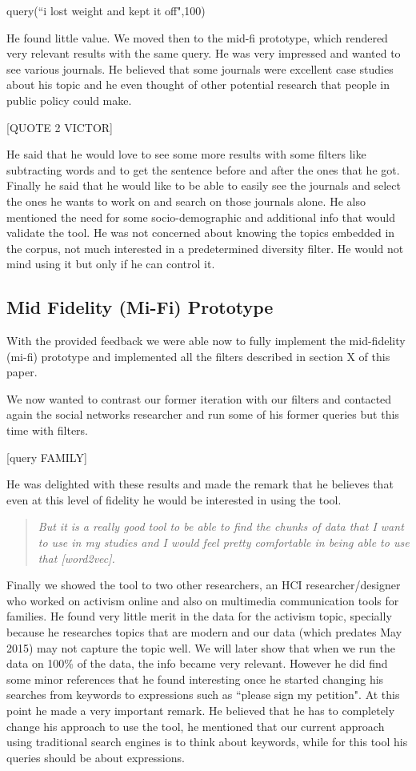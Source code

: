 \documentclass{sigchi}
\begin{document}
query(``i lost weight and kept it off",100)

He found little value. We moved then to the mid-fi prototype, which rendered very relevant results with the same query. He was very impressed and wanted to see various journals. He believed that some journals were excellent case studies about his topic and he even thought of other potential research that people in public policy could make. 

[QUOTE 2 VICTOR]

He said that he would love to see some more results with some filters like subtracting words and to get the sentence before and after the ones that he got. Finally he said that he would like to be able to easily see the journals and select the ones he wants to work on and search on those journals alone. He also mentioned the need for some socio-demographic and additional info that would validate the tool. He was not concerned about knowing the topics embedded in the corpus, not much interested in a predetermined diversity filter. He would not mind using it but only if he can control it.

\subsection{Mid Fidelity (Mi-Fi) Prototype}
With the provided feedback we were able now to fully implement the mid-fidelity (mi-fi) prototype and implemented all the filters described in section X of this paper.

We now wanted to contrast our former iteration with our filters and contacted again the social networks researcher and run some of his former queries but this time with filters. 

[query FAMILY]

He was delighted with these results and made the remark that he believes that even at this level of fidelity he would be interested in using the tool.
\begin{quote}
{\em
But it is a really good tool to be able to find the chunks of data that I want to use in my studies and I would feel pretty comfortable in being able to use that [word2vec].}
\end{quote}

Finally we showed the tool to two other researchers, an HCI researcher/designer who worked on activism online and also on multimedia communication tools for families. He found very little merit in the data for the activism topic, specially because he researches topics that are modern and our data (which predates May 2015) may not capture the topic well. We will later show that when we run the data on 100\% of the data, the info became very relevant. However he did find some minor references that he found interesting once he started changing his searches from keywords to expressions such as ``please sign my petition". At this point he made a very important remark. He believed that he has to completely change his approach to use the tool, he mentioned that our current approach using traditional search engines is to think about keywords, while for this tool his queries should be about expressions. 
\end{document}
